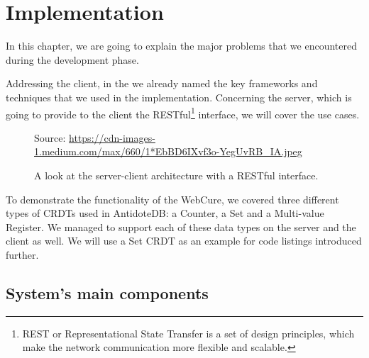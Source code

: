 \chapter{Implementation}
\label{Implementation}

In this chapter, we are going to explain the major problems that we encountered during the development phase.

Addressing the client, in the  we already named the key frameworks and techniques that we used in the implementation. Concerning the server, which is going to provide to the client the RESTful\footnote{REST or Representational State Transfer is a set of design principles, which make the network communication more flexible and scalable\cite{40}.} interface, we will cover the use cases.

\begin{figure}[!htb]
    \begin{center}
    \setlength{\fboxsep}{4pt}%
    \setlength{\fboxrule}{1pt}%
    {\scriptsize%
     Source: \url{https://cdn-images-1.medium.com/max/660/1*EbBD6IXvf3o-YegUvRB_IA.jpeg}}
    \caption {A look at the server-client architecture with a RESTful interface.}
    \label{fig:design1}
\end{center}
\end{figure}

To demonstrate the functionality of the WebCure, we covered three different types of CRDTs used in AntidoteDB: a Counter, a Set and a Multi-value Register. We managed to support each of these data types on the server and the client as well. We will use a Set CRDT as an example for code listings introduced further.

\section{System's main components}

